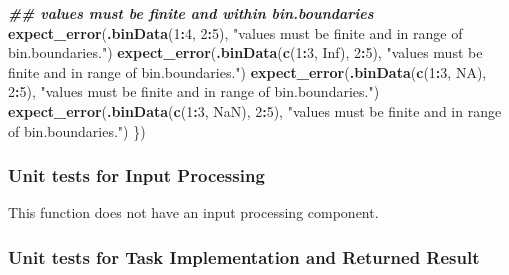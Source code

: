 \documentclass[
]{book}
\newenvironment{Shaded}{\begin{snugshade}}{\end{snugshade}}
\newcommand{\ConstantTok}[1]{\textcolor[rgb]{0.56,0.35,0.01}{#1}}
\newcommand{\DecValTok}[1]{\textcolor[rgb]{0.00,0.00,0.81}{#1}}
\newcommand{\DocumentationTok}[1]{\textcolor[rgb]{0.56,0.35,0.01}{\textbf{\textit{#1}}}}
\newcommand{\FunctionTok}[1]{\textcolor[rgb]{0.13,0.29,0.53}{\textbf{#1}}}
\newcommand{\NormalTok}[1]{#1}
\newcommand{\SpecialCharTok}[1]{\textcolor[rgb]{0.81,0.36,0.00}{\textbf{#1}}}
\newcommand{\StringTok}[1]{\textcolor[rgb]{0.31,0.60,0.02}{#1}}
\begin{document}
\begin{Shaded}
\begin{Highlighting}[]
  \DocumentationTok{\#\# \textasciigrave{}values\textasciigrave{} must be finite and within \textasciigrave{}bin.boundaries\textasciigrave{}}
  \FunctionTok{expect\_error}\NormalTok{(}\FunctionTok{.binData}\NormalTok{(}\DecValTok{1}\SpecialCharTok{:}\DecValTok{4}\NormalTok{, }\DecValTok{2}\SpecialCharTok{:}\DecValTok{5}\NormalTok{),}
               \StringTok{"\textasciigrave{}values\textasciigrave{} must be finite and in range of \textasciigrave{}bin.boundaries\textasciigrave{}."}\NormalTok{)}
  \FunctionTok{expect\_error}\NormalTok{(}\FunctionTok{.binData}\NormalTok{(}\FunctionTok{c}\NormalTok{(}\DecValTok{1}\SpecialCharTok{:}\DecValTok{3}\NormalTok{, }\ConstantTok{Inf}\NormalTok{), }\DecValTok{2}\SpecialCharTok{:}\DecValTok{5}\NormalTok{),}
               \StringTok{"\textasciigrave{}values\textasciigrave{} must be finite and in range of \textasciigrave{}bin.boundaries\textasciigrave{}."}\NormalTok{)}
  \FunctionTok{expect\_error}\NormalTok{(}\FunctionTok{.binData}\NormalTok{(}\FunctionTok{c}\NormalTok{(}\DecValTok{1}\SpecialCharTok{:}\DecValTok{3}\NormalTok{, }\ConstantTok{NA}\NormalTok{), }\DecValTok{2}\SpecialCharTok{:}\DecValTok{5}\NormalTok{),}
               \StringTok{"\textasciigrave{}values\textasciigrave{} must be finite and in range of \textasciigrave{}bin.boundaries\textasciigrave{}."}\NormalTok{)}
  \FunctionTok{expect\_error}\NormalTok{(}\FunctionTok{.binData}\NormalTok{(}\FunctionTok{c}\NormalTok{(}\DecValTok{1}\SpecialCharTok{:}\DecValTok{3}\NormalTok{, }\ConstantTok{NaN}\NormalTok{), }\DecValTok{2}\SpecialCharTok{:}\DecValTok{5}\NormalTok{),}
               \StringTok{"\textasciigrave{}values\textasciigrave{} must be finite and in range of \textasciigrave{}bin.boundaries\textasciigrave{}."}\NormalTok{)}
\NormalTok{\})}
\end{Highlighting}
\end{Shaded}

\hypertarget{unit-tests-for-input-processing}{%
\subsubsection{Unit tests for Input Processing}\label{unit-tests-for-input-processing}}

This function does not have an input processing component.

\hypertarget{unit-tests-for-task-implementation-and-returned-result}{%
\subsubsection{Unit tests for Task Implementation and Returned Result}\label{unit-tests-for-task-implementation-and-returned-result}}
\end{document}
